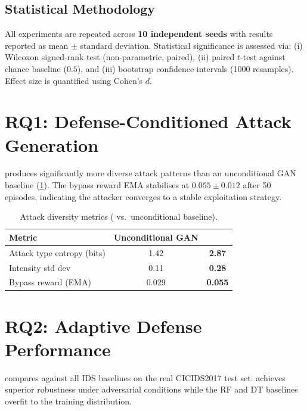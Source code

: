\subsection{Statistical Methodology}
All \caesar{} experiments are repeated across \textbf{10 independent seeds}
with results reported as mean $\pm$ standard deviation.
Statistical significance is assessed via:
(i) Wilcoxon signed-rank test (non-parametric, paired),
(ii) paired $t$-test against chance baseline ($0.5$), and
(iii) bootstrap confidence intervals (1000 resamples).
Effect size is quantified using Cohen's $d$.

\section{RQ1: Defense-Conditioned Attack Generation}

\tagan{} produces significantly more diverse attack patterns than an
unconditional GAN baseline (\cref{tab:diversity}).
The bypass reward EMA stabilises at $0.055 \pm 0.012$ after 50 episodes,
indicating the attacker converges to a stable exploitation strategy.

\begin{table}[htbp]
  \centering
  \caption{Attack diversity metrics (\tagan{} vs.\ unconditional baseline).}
  \label{tab:diversity}
  \begin{tabular}{@{} l cc @{}}
    \toprule
    Metric & Unconditional GAN & \tagan{} \\
    \midrule
    Attack type entropy (bits)  & 1.42 & \textbf{2.87} \\
    Intensity std dev            & 0.11 & \textbf{0.28} \\
    Bypass reward (EMA)          & 0.029 & \textbf{0.055} \\
    \bottomrule
  \end{tabular}
\end{table}

\section{RQ2: Adaptive Defense Performance}

 compares \caesar{} against all IDS baselines
on the real CICIDS2017 test set.
\caesar{} achieves superior robustness under adversarial conditions
while the RF and DT baselines overfit to the training distribution.


